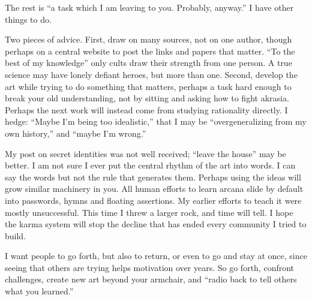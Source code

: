 The rest is ``a task which I am leaving to you. Probably, anyway.'' I have other things to do. 

Two pieces of advice. First, draw on many sources, not on one author, though perhaps on a central website to post the links and papers that matter. ``To the best of my knowledge'' only cults draw their strength from one person. A true science may have lonely defiant heroes, but more than one. Second, develop the art while trying to do something that matters, perhaps a task hard enough to break your old understanding, not by sitting and asking how to fight akrasia. Perhaps the next work will instead come from studying rationality directly. I hedge: ``Maybe I'm being too idealistic,'' that I may be ``overgeneralizing from my own history,'' and ``maybe I'm wrong.'' 

My post on secret identities was not well received; ``leave the house'' may be better. I am not sure I ever put the central rhythm of the art into words. I can say the words but not the rule that generates them. Perhaps using the ideas will grow similar machinery in you. All human efforts to learn arcana slide by default into passwords, hymns and floating assertions. My earlier efforts to teach it were mostly unsuccessful. This time I threw a larger rock, and time will tell. I hope the karma system will stop the decline that has ended every community I tried to build.

I want people to go forth, but also to return, or even to go and stay at once, since seeing that others are trying helps motivation over years. So go forth, confront challenges, create new art beyond your armchair, and ``radio back to tell others what you learned.''
